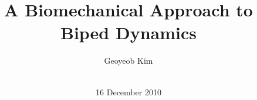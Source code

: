 \documentclass{acm_proc_article-sp}
\begin{document}
\title{A Biomechanical Approach to Biped Dynamics}
%
%
%
%
%

%
\author{
%
%
\alignauthor
Geoyeob Kim\\
       \\
}

\date{16 December 2010}
\end{document}
